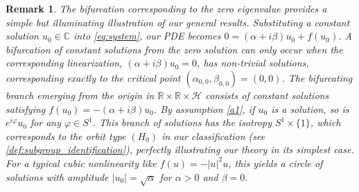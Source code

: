 \documentclass[11pt]{amsart}
\def\bc{{\mathbb{C}}}
\def\br{{\mathbb{R}}}
\def\br{\mathbb R}
\newtheorem{remark}{Remark}[section]
\begin{document}
\begin{remark} \label{rm:constant_sol_bif} \rm
The bifurcation corresponding to the zero eigenvalue provides a simple but illuminating illustration of our general results. Substituting a constant solution $u_0 \in \bc$ into \eqref{eq:system}, our PDE becomes 
$0 = (\alpha+i\beta)u_0 + f(u_0)$. A bifurcation of constant solutions from the zero solution can only occur when the corresponding linearization, $(\alpha+i\beta)u_0=0$, has non-trivial solutions, corresponding exactly to the critical point $(\alpha_{0,0}, \beta_{0,0}) =(0,0)$.  The bifurcating branch emerging from the origin in $\br \times \br \times \mathscr H$ consists of constant solutions satisfying $f(u_0)=-(\alpha+i\beta)u_0$. By assumption \ref{a1}, if $u_0$ is a solution, so is $e^{i\varphi}u_0$ for any $\varphi \in S^1$. This branch of solutions has the isotropy $S^1 \times \{1\}$, which corresponds to the orbit type $(H_0)$ in our classification (see \eqref{def:subgroup_identification}), perfectly illustrating our theory in its simplest case. For a typical cubic nonlinearity like $f(u)=-|u|^2u$, this yields a circle of solutions with amplitude $|u_0|=\sqrt{\alpha}$ for $\alpha>0$ and $\beta=0$.
\end{remark}
\end{document}
